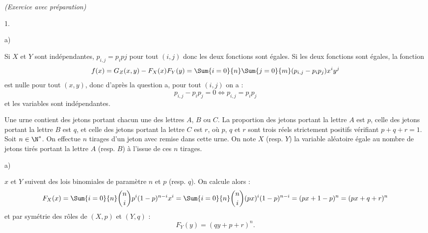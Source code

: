 \documentclass[11pt]{article}%
\begin{document}
\begin{exercice}{\it (Exercice avec préparation)}
\begin{noliste}{1.}
\begin{noliste}{a)}
    \item Si $X$ et $Y$ sont indépendantes, $p_{i,j} = p_{i} pj$ pour
      tout $(i,j)$ donc les deux fonctions sont égales. Si les deux
      fonctions sont égales, la fonction
      \[
      f(x) = G_{Z} ( x,y) - F_{X} ( x) F_{Y} (y) = \Sum{i = 0}{n} \Sum{j =
        0}{m} (p_{i,j} - p_{i} p_{j} ) x^{i} y^{j}
      \]
      est nulle pour tout $(x,y)$, donc d'après la question a, pour
      tout $(i,j)$ on a :      
      \[
      p_{i,j} - p_{i} p_{j} = 0 \Longleftrightarrow p_{i,j} = p_{i} p_{j} 
      \]
      et les variables sont indépendantes. 
    \end{noliste}
 
  \item Une urne contient des jetons portant chacun une des lettres
    $A$, $B$ ou $C$. La proportion des jetons portant la lettre $A$
    est $p$, celle des jetons portant la lettre $B$ est $q$, et celle
    des jetons portant la lettre $C$ est $r$, où $p$, $q$ et $r$ sont
    trois réels strictement positifs vérifiant $p + q + r = 1$. \\
    Soit $n \in \N^*$. On effectue $n$ tirages d'un jeton avec remise
    dans cette urne. On note $X$ (resp. $Y$) la variable aléatoire
    égale au nombre de jetons tirés portant la lettre $A$ (resp. $B$)
    à l'issue de ces $n$ tirages.
 
    \begin{noliste}{a)}
      \setlength{\itemsep}{2mm}
    \item $x$ et $Y$ suivent des lois binomiales de paramètre $n$ et
      $p$ (resp. $q$). On calcule alors :      
      \[
      F_{X} ( x) = \Sum{i = 0}{n} \binom{n}{i} p^{i} (1-p)^{n-i} x^{i}
      = \Sum{i = 0}{n} \binom{n}{i} (px)^{i} (1-p)^{n-i} = (px + 1 -
      p)^{n} = (px + q + r)^{n}
      \]
      et par symétrie des rôles de $(X,p)$ et $(Y, q)$ :      
      \[
      F_{Y} (y) = ( q y + p + r )^{n}. 
      \]
      

\end{noliste}
\end{noliste}
\end{exercice}
\end{document}

